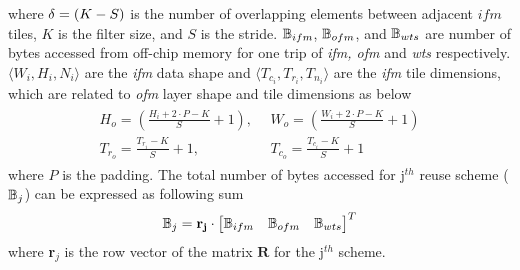 where $\delta=(K-S)$ is the number of overlapping elements between adjacent $ifm$ tiles, $K$ is the filter size, and $S$ is the stride. $\mathbb{B}_{ifm}$, $\mathbb{B}_{ofm}$, and $\mathbb{B}_{wts}$ are number of bytes accessed from off-chip memory for one trip of \textit{ifm, ofm} and \textit{wts} respectively. $\langle W_{i},H_{i},N_{i}\rangle$ are the \textit{ifm} data shape and $\langle T_{c_i},T_{r_i},T_{n_i}\rangle$ are the \textit{ifm} tile dimensions, which are related to \textit{ofm} layer shape and tile dimensions as below
\begin{align}\label{eq:ofmAndifmTileDims}
	\begin{split}
		H_o=(\frac{H_{i}+2\cdot P-K}{S}+1), ~\ &W_o=(\frac{W_{i}+2\cdot P-K}{S}+1)\\
		T_{r_o}=\frac{T_{r_{i}}-K}{S}+1,~\ &T_{c_o}=\frac{T_{c_{i}}-K}{S}+1
	\end{split}
\end{align}  
where $P$ is the padding. The total number of bytes accessed for j$^{th}$ reuse scheme ($\mathbb{B}_j$) can be expressed as following sum
\begin{equation} \label{eq:TotalOffChipAccess}
	\mathbb{B}_j=\mathbf{r_j}\cdot \begin{bmatrix}
		\mathbb{B}_{ifm} &
		\mathbb{B}_{ofm} &
		\mathbb{B}_{wts}
	\end{bmatrix}^{T}
\end{equation}
where \textbf{r}$_j$ is the row vector of the matrix $\mathbf{R}$ for the j$^{th}$ scheme. 
